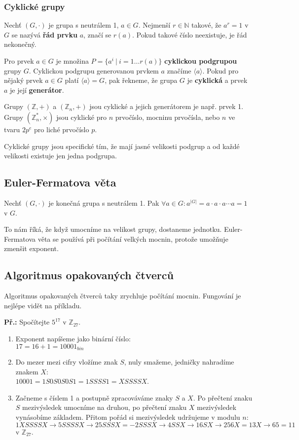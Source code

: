 \documentclass[10pt,a4paper]{article}
\begin{document}
\subsubsection{Cyklické grupy}

Nechť $(G,\cdot)$ je grupa s neutrálem 1, $a \in G$. Nejmenší $r \in \mathbb{N}$
takové, že $a^r = 1$ v $G$ se nazývá \textbf{řád prvku} $a$, značí se $r(a)$.
Pokud takové číslo neexistuje, je řád nekonečný.

Pro prvek $a \in G$ je množina $P = \{a^i~|~i = 1 \ldots r(a)\}$
\textbf{cyklickou podgrupou} grupy $G$. Cyklickou podgrupu generovanou prvkem
$a$ značíme $\langle a \rangle$. Pokud pro nějaký prvek $a \in G$ platí $\langle
a \rangle  = G$, pak řekneme, že grupa $G$ je \textbf{cyklická} a prvek $a$ je
její \textbf{generátor}.

Grupy $(\mathbb{Z}, +)$ a $(\mathbb{Z}_n, +)$ jsou cyklické a jejich generátorem
je např. prvek 1. Grupy $(\mathbb{Z}_n^*, \times)$ jsou cyklické pro $n$
prvočíslo, mocninu prvočísla, nebo $n$ ve tvaru $2p^e$ pro liché prvočíslo $p$.

Cyklické grupy jsou specifické tím, že mají jasné velikosti podgrup a od každé
velikosti existuje jen jedna podgrupa.

\subsection{Euler-Fermatova věta}
Nechť $(G,\cdot)$ je konečná grupa s neutrálem 1. Pak $\forall a \in G: a^{|G|}
= a\cdot a\cdot a\cdots a = 1$ v $G$.

To nám říká, že když umocníme na velikost grupy, dostaneme jednotku.
Euler-Fermatova věta se používá při počítání velkých mocnin, protože umožňuje
zmenšit exponent.

\subsection{Algoritmus opakovaných čtverců}

Algoritmus opakovaných čtverců taky zrychluje počítání mocnin. Fungování je
nejlépe vidět na příkladu.

\begin{exercise}
\textbf{Př.:} Spočítejte $5^{17}$ v $\mathbb{Z}_{27}$.
\begin{enumerate}
\item Exponent napíšeme jako binární číslo:\\ $17 = 16 + 1 = 10001_{bin}$
\item Do mezer mezi cifry vložíme znak $S$, nuly smažeme, jedničky nahradíme
znakem $X$:\\ $10001 = 1S0S0S0S1 = 1SSSS1 = XSSSSX$.
\item Začneme s číslem 1 a postupně zpracováváme znaky $S$ a $X$. Po přečtení
znaku $S$ mezivýsledek umocníme na druhou, po přečtení znaku $X$ mezivýsledek
vynásobíme základem. Přitom pořád si mezivýsledek udržujeme v modulu $n$:\\
$1XSSSSX \rightarrow 5SSSSX \rightarrow 25SSSX = -2SSSX \rightarrow 4SSX
\rightarrow 16SX \rightarrow 256X = 13X \rightarrow 65 = 11$ v
$\mathbb{Z}_{27}$.
\end{enumerate}
\end{exercise}
\end{document}
